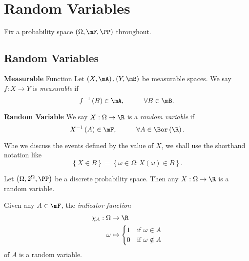 \documentclass[stat901]{subfiles}
\begin{document}
    \section{Random Variables}

    Fix a probability space $\left( \Omega,\mF,\PP \right)$ throughout.

    \subsection{Random Variables}

    \begin{definition}{\textbf{Measurable} Function}
        Let $\left( X,\mA \right), \left( Y,\mB \right)$ be measurable spaces. We say $f:X\to Y$ is \emph{measurable} if
        \begin{equation*}
            f^{-1}\left( B \right)\in\mA,\hspace{1cm}\forall B\in\mB.
        \end{equation*}
    \end{definition}

    \begin{definition}{\textbf{Random Variable}}
        We say $X:\Omega\to\R$ is a \emph{random variable} if
        \begin{equation*}
            X^{-1}\left( A \right)\in\mF,\hspace{1cm}\forall A\in\Bor\left( \R \right).
        \end{equation*}
    \end{definition}

    \np Whe we discuss the events defined by the value of $X$, we shall use the shorthand notation like
    \begin{equation*}
        \left\lbrace X\in B \right\rbrace = \left\lbrace \omega\in\Omega : X\left( \omega \right) \in B \right\rbrace.
    \end{equation*}

    \begin{example}{}
        Let $\left( \Omega,2^{\Omega},\PP \right)$ be a discrete probability space. Then any $X:\Omega\to\R$ is a random variable.
    \end{example}

    \rruleline

    \begin{example}{}
        Given any $A\in\mF$, the \textit{indicator function}
        \begin{equation*}
            \begin{aligned}
                \chi_A:\Omega&\to\R \\
                \omega & \mapsto
                \begin{cases} 
                    1 & \text{if $\omega\in A$} \\
                    0 & \text{if $\omega\notin A$}
                \end{cases}
            \end{aligned} 
        \end{equation*}
        of $A$ is a random variable.
    \end{example}
\end{document}
